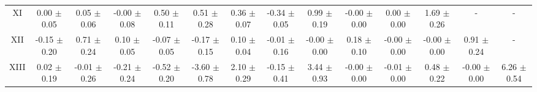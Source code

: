 \begin{table}[H]
{\begin{tabular}{cccccccccccccc}
        XI & 0.00 $\pm$ 0.05 & 0.05 $\pm$ 0.06 & -0.00 $\pm$ 0.08 & 0.50 $\pm$ 0.11 & 0.51 $\pm$ 0.28 & 0.36 $\pm$ 0.07 & -0.34 $\pm$ 0.05 & 0.99 $\pm$ 0.19 & -0.00 $\pm$ 0.00 & 0.00 $\pm$ 0.00 & 1.69 $\pm$ 0.26 & - & -\\
        XII & -0.15 $\pm$ 0.20 & 0.71 $\pm$ 0.24 & 0.10 $\pm$ 0.05 & -0.07 $\pm$ 0.05 & -0.17 $\pm$ 0.15 & 0.10 $\pm$ 0.04 & -0.01 $\pm$ 0.16 & -0.00 $\pm$ 0.00 & 0.18 $\pm$ 0.10 & -0.00 $\pm$ 0.00 & -0.00 $\pm$ 0.00 & 0.91 $\pm$ 0.24 & -\\
        XIII & 0.02 $\pm$ 0.19 & -0.01 $\pm$ 0.26 & -0.21 $\pm$ 0.24 & -0.52 $\pm$ 0.20 & -3.60 $\pm$ 0.78 & 2.10 $\pm$ 0.29 & -0.15 $\pm$ 0.41 & 3.44 $\pm$ 0.93 & -0.00 $\pm$ 0.00 & -0.01 $\pm$ 0.00 & 0.48 $\pm$ 0.22 & -0.00 $\pm$ 0.00 & 6.26 $\pm$ 0.54\\
    \hline\hline
    \end{tabular}}
\end{table}

